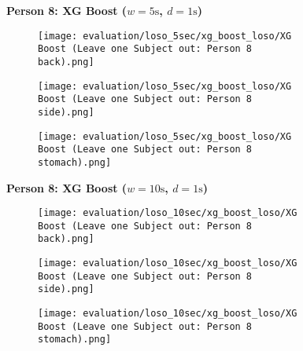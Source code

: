 \begin{figure}
    \textbf{Person 8: XG Boost ($w=5\si{\s}$, $d=1\si{\s}$)}
      \centering
      \begin{subfigure}{1\textwidth}
          \texttt{[image: evaluation/loso\_5sec/xg\_boost\_loso/XG Boost (Leave one Subject out: Person 8 back).png]}
        \end{subfigure}
        \begin{subfigure}{1\textwidth}
          \texttt{[image: evaluation/loso\_5sec/xg\_boost\_loso/XG Boost (Leave one Subject out: Person 8 side).png]}
        \end{subfigure}
        \begin{subfigure}{1\textwidth}
          \texttt{[image: evaluation/loso\_5sec/xg\_boost\_loso/XG Boost (Leave one Subject out: Person 8 stomach).png]}
      \end{subfigure}
        \textbf{Person 8: XG Boost ($w=10\si{\s}$, $d=1\si{\s}$)}
      \centering
      \begin{subfigure}{1\textwidth}
          \texttt{[image: evaluation/loso\_10sec/xg\_boost\_loso/XG Boost (Leave one Subject out: Person 8 back).png]}
        \end{subfigure}
        \begin{subfigure}{1\textwidth}
          \texttt{[image: evaluation/loso\_10sec/xg\_boost\_loso/XG Boost (Leave one Subject out: Person 8 side).png]}
        \end{subfigure}
        \begin{subfigure}{1\textwidth}
          \texttt{[image: evaluation/loso\_10sec/xg\_boost\_loso/XG Boost (Leave one Subject out: Person 8 stomach).png]}
      \end{subfigure}
  
      \label{evaluation:xgboost_loso:person6}
\end{figure}

